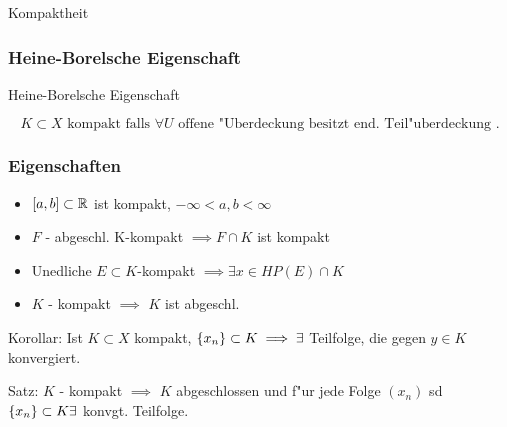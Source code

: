 \documentclass[class=article, crop=false]{standalone}
\begin{document}
\begin{zettel}{Kompaktheit}
\begin{flashcard}
\subsubsection*{Heine-Borelsche Eigenschaft}
\begin{question}
    Heine-Borelsche Eigenschaft
\end{question}
\[
    K \subset X \text{ kompakt falls } \forall U \text{ offene "Uberdeckung besitzt end. Teil"uberdeckung } 
.\]
\end{flashcard}

\subsubsection*{Eigenschaften}
\begin{itemize}
    \item $[a,b] \subset \mathbb{R}$ ist kompakt,  $-\infty < a,b < \infty $
    \item $F$ - abgeschl. K-kompakt $\implies F \cap K$ ist kompakt
    \item Unedliche $E \subset K $-kompakt  $\implies \exists x \in  HP (E) \cap K$ 
    \item $K$ - kompakt $\implies $ $K$ ist abgeschl.
\end{itemize}


Korollar: Ist $K \subset X$ kompakt, $\set{x_n } \subset K \implies  \exists$ Teilfolge, die gegen $y \in  K$ konvergiert.

Satz: $K$ - kompakt $\implies $  $K$ abgeschlossen und f"ur jede Folge $(x_n )$ sd $\set{x_n } \subset K \exists $ konvgt. Teilfolge.

\end{zettel}
\end{document}
